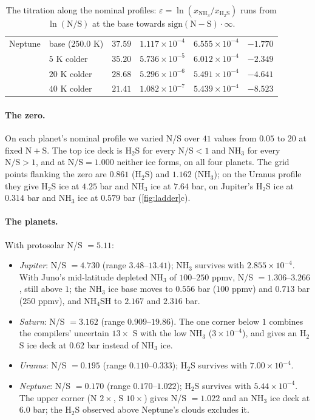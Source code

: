 \documentclass[11pt]{article}
\theoremstyle{definition}\newtheorem{definition}[theorem]{Definition}
\theoremstyle{remark}\newtheorem{remark}[theorem]{Remark}
\newcommand{\NH}{\mathrm{NH_3}}\newcommand{\HS}{\mathrm{H_2S}}\newcommand{\NHSH}{\mathrm{NH_4SH}}
\begin{document}
\begin{table}[!htb]
\begin{tabular}{@{}llcccc@{}}
Neptune & base ($250.0$ K) & $37.59$ & $1.117\times10^{-4}$ & $6.555\times10^{-4}$ & $-1.770$\\
 & $5$ K colder & $35.20$ & $5.736\times10^{-5}$ & $6.012\times10^{-4}$ & $-2.349$\\
 & $20$ K colder & $28.68$ & $5.296\times10^{-6}$ & $5.491\times10^{-4}$ & $-4.641$\\
 & $40$ K colder & $21.41$ & $1.082\times10^{-7}$ & $5.439\times10^{-4}$ & $-8.523$\\\bottomrule
\end{tabular}
\caption{The titration along the nominal profiles: $\varepsilon=\ln(x_{\NH}/x_{\HS})$ runs from $\ln(\mathrm N/\mathrm S)$ at the base towards $\mathrm{sign}(\mathrm N-\mathrm S)\cdot\infty$.}\label{tab:eps}
\end{table}

\paragraph{The zero.} On each planet's nominal profile we varied N/S over $41$ values from $0.05$ to $20$ at fixed $\mathrm N+\mathrm S$. The top ice deck is H$_2$S for every $\mathrm N/\mathrm S<1$ and NH$_3$ for every $\mathrm N/\mathrm S>1$, and at $\mathrm N/\mathrm S=1.000$ neither ice forms, on all four planets. The grid points flanking the zero are $0.861$ (H$_2$S) and $1.162$ (NH$_3$); on the Uranus profile they give H$_2$S ice at $4.25$ bar and NH$_3$ ice at $7.64$ bar, on Jupiter's H$_2$S ice at $0.314$ bar and NH$_3$ ice at $0.579$ bar (\cref{fig:ladder}c).

\paragraph{The planets.} With protosolar N/S $=5.11$:
\begin{itemize}
\item \emph{Jupiter}: N/S $=4.730$ (range $3.48$--$13.41$); NH$_3$ survives with $2.855\times10^{-4}$. With Juno's mid-latitude depleted NH$_3$ of $100$--$250$ ppmv, N/S $=1.306$--$3.266$, still above $1$; the NH$_3$ ice base moves to $0.556$ bar ($100$ ppmv) and $0.713$ bar ($250$ ppmv), and NH$_4$SH to $2.167$ and $2.316$ bar.
\item \emph{Saturn}: N/S $=3.162$ (range $0.909$--$19.86$). The one corner below $1$ combines the compilers' uncertain $13\times$ S with the low NH$_3$ ($3\times10^{-4}$), and gives an H$_2$S ice deck at $0.62$ bar instead of NH$_3$ ice.
\item \emph{Uranus}: N/S $=0.195$ (range $0.110$--$0.333$); H$_2$S survives with $7.00\times10^{-4}$.
\item \emph{Neptune}: N/S $=0.170$ (range $0.170$--$1.022$); H$_2$S survives with $5.44\times10^{-4}$. The upper corner (N $2\times$, S $10\times$) gives N/S $=1.022$ and an NH$_3$ ice deck at $6.0$ bar; the H$_2$S observed above Neptune's clouds \cite{Irwin2019a} excludes it.
\end{itemize}
\end{document}
